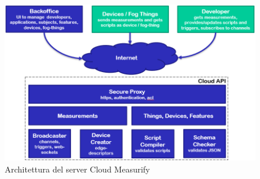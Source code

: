 \begin{figure}[H]
	\centering
	\includegraphics[width=\linewidth]{pics/cloudAPI}
	\caption{Architettura del server Cloud Measurify}
	\label{cloudAPI}
\end{figure}
